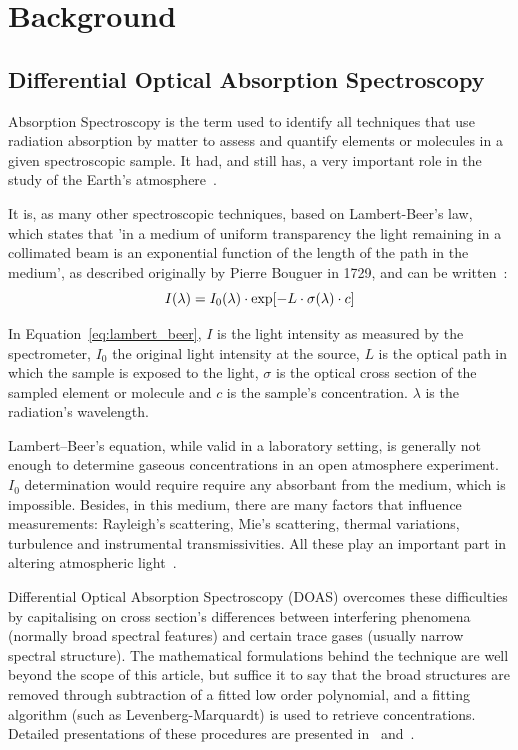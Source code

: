 \section{Background}
\label{sec:background}

\subsection{Differential Optical Absorption Spectroscopy}
\label{ssub:differential_optical_absorption_spectroscopy}
Absorption Spectroscopy is the term used to identify all techniques that
use radiation absorption by matter to assess and quantify elements or
molecules in a given spectroscopic sample. It had, and still has, a very
important role in the study of the Earth's atmosphere~\cite{Platt2007}.

It is, as many other spectroscopic techniques, based on Lambert-Beer's
law, which states that 'in a medium of uniform transparency the light
remaining in a collimated beam is an exponential function of the length
of the path in the medium', as described originally by Pierre Bouguer in
1729, and can be written~\cite{Platt2007}:
\begin{equation}
    \centering
    I(\lambda) = I_0(\lambda) \cdot \exp[-L \cdot \sigma(\lambda) \cdot c]
    \label{eq:lambert_beer}   
\end{equation}

In Equation~\ref{eq:lambert_beer}, $I$ is the light intensity as measured by the
spectrometer, $I_0$ the original light intensity at the source, $L$ is
the optical path in which the sample is exposed to the light, $\sigma$
is the optical cross section of the sampled element or molecule and $c$
is the sample's concentration. $\lambda$ is the radiation's wavelength.

Lambert--Beer's equation, while valid in a laboratory setting, is
generally not enough to determine gaseous concentrations in an open
atmosphere experiment. $I_0$ determination would require require any
absorbant from the medium, which is impossible. Besides, in this medium,
there are many factors that influence measurements: Rayleigh's
scattering, Mie's scattering, thermal variations, turbulence and
instrumental transmissivities. All these play an important part in
altering atmospheric light~\cite{Platt2007, Merlaud2013}.

Differential Optical Absorption Spectroscopy (DOAS) overcomes these
difficulties by capitalising on cross section's differences between
interfering phenomena (normally broad spectral features) and certain
trace gases (usually narrow spectral structure).  The mathematical
formulations behind the technique are well beyond the scope of this
article, but suffice it to say that the broad structures are removed
through subtraction of a fitted low order polynomial, and a fitting
algorithm (such as Levenberg-Marquardt) is used to retrieve
concentrations. Detailed presentations of these procedures are presented
in~\cite{Platt2007} and~\cite{Merlaud2013}.

